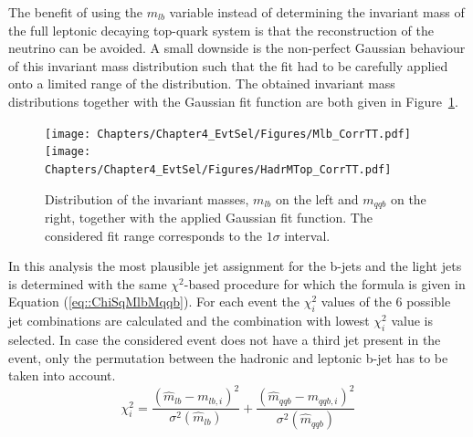 The benefit of using the $m_{lb}$ variable instead of determining the invariant mass of the full leptonic decaying top-quark system is that the reconstruction of the neutrino can be avoided.
A small downside is the non-perfect Gaussian behaviour of this invariant mass distribution such that the fit had to be carefully applied onto a limited range of the distribution.
The obtained invariant mass distributions together with the Gaussian fit function are both given in Figure~\ref{fig::InvMasses}. %
\\
\begin{figure}[h!t]
 \centering
 \texttt{[image: Chapters/Chapter4\_EvtSel/Figures/Mlb\_CorrTT.pdf]} \hspace{0.2cm} %
 \texttt{[image: Chapters/Chapter4\_EvtSel/Figures/HadrMTop\_CorrTT.pdf]} %
 \caption{Distribution of the invariant masses, $m_{lb}$ on the left and $m_{qqb}$ on the right, together with the applied Gaussian fit function. The considered fit range corresponds to the $1\sigma$ interval.} \label{fig::InvMasses}
\end{figure}

In this analysis the most plausible jet assignment for the b-jets and the light jets is determined with the same $\chi^{2}$-based procedure for which the formula is given in Equation (\ref{eq::ChiSqMlbMqqb}).
For each event the $\chi^{2}_{i}$ values of the 6 possible jet combinations are calculated and the combination with lowest $\chi^2_{i}$ value is selected.
In case the considered event does not have a third jet present in the event, only the permutation between the hadronic and leptonic b-jet has to be taken into account.
\begin{equation} \label{eq::ChiSqMlbMqqb}
 \chi^{2}_{i} = \frac{(\hat{m}_{lb} - m_{lb,i})^{2}}{\sigma^{2}(\hat{m}_{lb})} + \frac{(\hat{m}_{qqb} - m_{qqb,i})^{2}}{\sigma^{2}(\hat{m}_{qqb})}
\end{equation}

